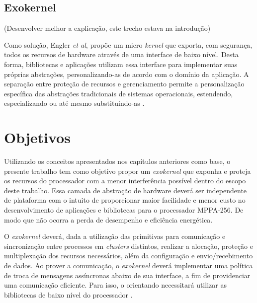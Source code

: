 \documentclass[
	12pt,				%
	openright,			%
	twoside,			%
	a4paper,			%
	english,			%
	brazil,				%
	]{abntex2}
\begin{document}
    \section{Exokernel}
    \label{sec:exokernel}
    
        (Desenvolver melhor a explicação, este trecho estava na introdução)
        
        Como solução, Engler \textit{et al}, propõe um micro \textit{kernel} que exporta, com segurança, todos os recursos de hardware através de uma interface de baixo nível.
        Desta forma, bibliotecas e aplicações utilizam essa interface para implementar suas próprias abstrações, personalizando-as de acordo com o domínio da aplicação.
        A separação entre proteção de recursos e gerenciamento permite a personalização específica das abstrações tradicionais de sistemas operacionais, estendendo, especializando ou até mesmo substituindo-as \cite{engler_exokernel:_1995}.
    
\chapter{Objetivos}
\label{cap:objetivos}

    Utilizando os conceitos apresentados nos capítulos anteriores como base, o presente trabalho tem como objetivo propor um \textit{exokernel} que exponha e proteja os recursos do processador \mppa com a menor interferência possível dentro do escopo deste trabalho.
    Essa camada de abstração de hardware deverá ser independente de plataforma com o intuito de proporcionar maior facilidade e menor custo no desenvolvimento de aplicações e bibliotecas para o processador MPPA-256. De modo que não ocorra a perda de desempenho e eficiência energética.
    
    O \textit{exokernel} deverá, dada a utilização das primitivas \ipc para comunicação e sincronização entre processos em \textit{clusters} distintos, realizar a alocação, proteção e multiplexação dos recursos necessários, além da configuração e envio/recebimento de dados.
    Ao prover a comunicação, o \textit{exokernel} deverá implementar uma política de troca de mensagens assíncronas abaixo de sua interface, a fim de providenciar uma comunicação eficiente.
    Para isso, o orientando necessitará utilizar as bibliotecas de baixo nível do processador \mppa. 
    
\end{document}
